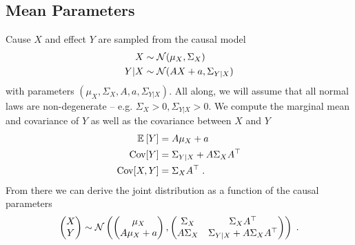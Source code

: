 \begin{subappendices}
\subsection{Mean Parameters}
Cause $X$ and effect $Y$ are sampled from the causal model
\begin{align*}
    X &\sim {\mathcal N}(\mu_X, \Sigma_X) \\
    Y|X &\sim {\mathcal N}(A X + a, \Sigma_{Y|X})
\end{align*}
with parameters $(\mu_X, \Sigma_X, A, a, \Sigma_{Y|X})$.
All along, we will assume that all normal laws are non-degenerate -- e.g. $\Sigma_X > 0, \Sigma_{Y|X} >0$.
We  compute the marginal mean and covariance of $Y$ as well as the covariance between $X$ and $Y$
\begin{align*}
    \mathbb{E}_{} \left[ Y \right]  &= A\mu_X + a \\
    \operatorname{\mathrm{Cov}}[Y] &= \Sigma_{Y|X} + A\Sigma_X A^\top \\
    \operatorname{\mathrm{Cov}}[X,Y] &= \Sigma_X A^\top \; .
\end{align*}
From there we can derive the joint distribution as a function of the causal parameters
\begin{equation}
    \begin{pmatrix}
    X \\ Y
    \end{pmatrix}
    \sim {\mathcal N} \left (
    \begin{pmatrix}
    \mu_X \\
    A\mu_X + a
    \end{pmatrix},
    \begin{pmatrix}
    \Sigma_X & \Sigma_X A^\top \\
    A\Sigma_X & \Sigma_{Y|X} + A\Sigma_X A^\top
    \end{pmatrix}
    \right ) \; .
\end{equation}


\end{subappendices}
